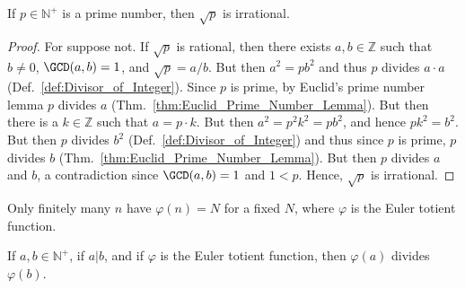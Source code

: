 \documentclass{article}                                                        %
\begin{document}
            \begin{theorem}
                \label{thm:SQRT_Primes_are_Irrational}%
                If $p\in\mathbb{N}^{+}$ is a prime number, then $\sqrt{p}$ is
                irrational.
            \end{theorem}
            \begin{proof}
                For suppose not. If $\sqrt{p}$ is rational, then there exists
                $a,b\in\mathbb{Z}$ such that $b\ne{0}$, $\GCD(a,b)=1$, and
                $\sqrt{p}=a/b$. But then $a^{2}=pb^{2}$ and thus $p$ divides
                $a\cdot{a}$ (Def.~\ref{def:Divisor_of_Integer}). Since $p$ is
                prime, by Euclid's prime number lemma $p$ divides $a$
                (Thm.~\ref{thm:Euclid_Prime_Number_Lemma}). But then there is a
                $k\in\mathbb{Z}$ such that $a=p\cdot{k}$. But then
                $a^{2}=p^{2}k^{2}=pb^{2}$, and hence $pk^{2}=b^{2}$. But then
                $p$ divides $b^{2}$ (Def.~\ref{def:Divisor_of_Integer}) and thus
                since $p$ is prime, $p$ divides $b$
                (Thm.~\ref{thm:Euclid_Prime_Number_Lemma}). But then $p$ divides
                $a$ and $b$, a contradiction since $\GCD(a,b)=1$ and $1<p$.
                Hence, $\sqrt{p}$ is irrational.
            \end{proof}
            Only finitely many $n$ have $\varphi(n)=N$ for a fixed $N$, where
            $\varphi$ is the Euler totient function.
            \begin{theorem}
                \label{thm:A_DIV_B_then_EulerTotA_Div_EulerTotB}%
                If $a,b\in\mathbb{N}^{+}$, if $a|b$, and if $\varphi$ is the
                Euler totient function, then $\varphi(a)$ divides $\varphi(b)$.
            \end{theorem}
\end{document}
